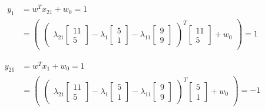 \documentclass[12pt]{report}
\begin{document}
\begin{equation*}
	\begin{aligned}
		y_{1} & =  w^T x_{21} + w_{0} = 1            \\
		      & = \begin{pmatrix}
			          \begin{pmatrix}
				\lambda_{21}\begin{bmatrix}
					            11 \\
					            5
				            \end{bmatrix} -

				\lambda_{1}\begin{bmatrix}
					           5 \\
					           1
				           \end{bmatrix} -

				\lambda_{11}\begin{bmatrix}
					            9 \\
					            9
				            \end{bmatrix}
			\end{pmatrix}  ^ T
			          \begin{bmatrix}
				11 \\
				5
			\end{bmatrix} + w_{0}
		          \end{pmatrix} = 1
	\end{aligned}
\end{equation*}

\begin{equation*}
	\begin{aligned}
		y_{21} & =  w^T x_{1} + w_{0} = 1             \\
		       & = \begin{pmatrix}
			           \begin{pmatrix}
				\lambda_{21}\begin{bmatrix}
					            11 \\
					            5
				            \end{bmatrix} -

				\lambda_{1}\begin{bmatrix}
					           5 \\
					           1
				           \end{bmatrix} -

				\lambda_{11}\begin{bmatrix}
					            9 \\
					            9
				            \end{bmatrix}
			\end{pmatrix}  ^ T
			           \begin{bmatrix}
				5 \\
				1
			\end{bmatrix} + w_{0}
		           \end{pmatrix} = -1
	\end{aligned}
\end{equation*}
\end{document}
